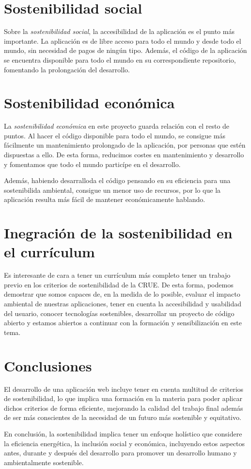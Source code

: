 \section{Sostenibilidad social}

Sobre la \emph{sostenibilidad social}, la accesibilidad de la aplicación es el punto más importante. La aplicación es de libre acceso para todo el mundo y desde todo el mundo, sin necesidad de pagos de ningún tipo. Además, el código de la aplicación se encuentra disponible para todo el mundo en su correspondiente repositorio, fomentando la prolongación del desarrollo.

\section{Sostenibilidad económica}

La \emph{sostenibilidad económica} en este proyecto guarda relación con el resto de puntos. Al hacer el código disponible para todo el mundo, se consigue más fácilmente un mantenimiento prolongado de la aplicación, por personas que estén dispuestas a ello. De esta forma, reducimos costes en mantenimiento y desarrollo y fomentamos que todo el mundo particípe en el desarrollo.

Además, habiendo desarralloda el código pensando en su eficiencia para una sostenibilida ambiental, consigue un menor uso de recursos, por lo que la aplicación resulta más fácil de mantener económicamente hablando.

\section{Inegración de la sostenibilidad en el currículum}

Es interesante de cara a tener un currículum más completo tener un trabajo previo en los criterios de sostenibilidad de la CRUE. De esta forma, podemos demostrar que somos capaces de, en la medida de lo posible, evaluar el impacto ambiental de nuestras aplicaciones, tener en cuenta la accesibilidad y usabilidad del usuario, conocer tecnologías sostenibles, desarrollar un proyecto de código abierto y estamos abiertos a continuar con la formación y sensibilización en este tema.

\section{Conclusiones}

El desarrollo de una aplicación web incluye tener en cuenta multitud de criterios de sostenibilidad, lo que implica una formación en la materia para poder aplicar dichos criterios de forma eficiente, mejorando la calidad del trabajo final además de ser más conscientes de la necesidad de un futuro más sostenible y equitativo.

En conclusión, la sostenibilidad implica tener un enfoque holístico que considere la eficiencia energética, la inclusión social y económica, incluyendo estos aspectos antes, durante y después del desarrollo para promover un desarrollo humano y ambientalmente sostenible.